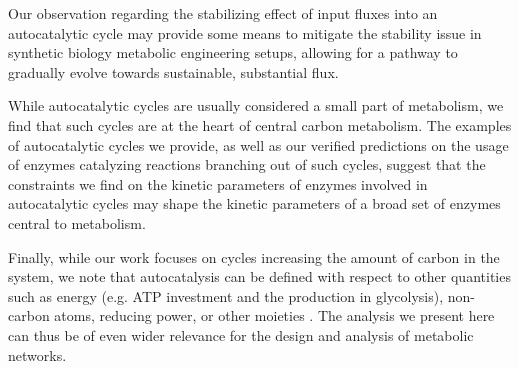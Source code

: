 Our observation regarding the stabilizing effect of input fluxes into an autocatalytic cycle may provide some means to mitigate the stability issue in synthetic biology metabolic engineering setups, allowing for a pathway to gradually evolve towards sustainable, substantial flux.

While autocatalytic cycles are usually considered a small part of metabolism, we find that such cycles are at the heart of central carbon metabolism.
The examples of autocatalytic cycles we provide, as well as our verified predictions on the usage of enzymes catalyzing reactions branching out of such cycles, suggest that the constraints we find on the kinetic parameters of enzymes involved in autocatalytic cycles may shape the kinetic parameters of a broad set of enzymes central to metabolism.

  Finally, while our work focuses on cycles increasing the amount of carbon in the system, we note that autocatalysis can be defined with respect to other quantities such as energy (e.g. ATP investment and the production in glycolysis), non-carbon atoms, reducing power, or other moieties \cite{Reich1981-qd}.
  The analysis we present here can thus be of even wider relevance for the design and analysis of metabolic networks.

